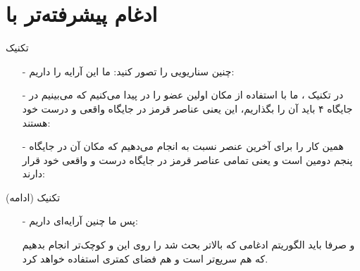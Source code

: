 \section{ادغام پیشرفته‌تر با }
\begin{frame}{تکنیک }
\begin{itemize}\itemr
\item[-]
چنین سناریویی را تصور کنید: ما این آرایه‌ را داریم:

\begin{lfl}
\end{lfl}

\item[-]
در تکنیک ، ما با استفاده از  مکان اولین عضو 
را در 
پیدا می‌کنیم که می‌بینیم در جایگاه ۴ باید آن را بگذاریم، این یعنی عناصر قرمز در جایگاه واقعی و درست خود هستند:
\begin{lfl}
\end{lfl}

\item[-]
همین کار را برای آخرین عنصر 
نسبت به 
انجام می‌دهیم که مکان آن در جایگاه پنجم دومین  است و یعنی تمامی عناصر قرمز در جایگاه درست و واقعی خود قرار دارند:
\begin{lfl}
\end{lfl}
\end{itemize}
\end{frame}

\begin{frame}{تکنیک  (ادامه)}
\begin{itemize}\itemr
\item[-]
پس ما چنین آرایه‌ای داریم:
\begin{lfl}
\end{lfl}
و صرفا باید الگوریتم ادغامی که بالاتر بحث شد را روی این 
و 
کوچک‌تر انجام بدهیم که هم سریع‌تر است و هم فضای کمتری استفاده خواهد کرد.
\end{itemize}
\end{frame}

